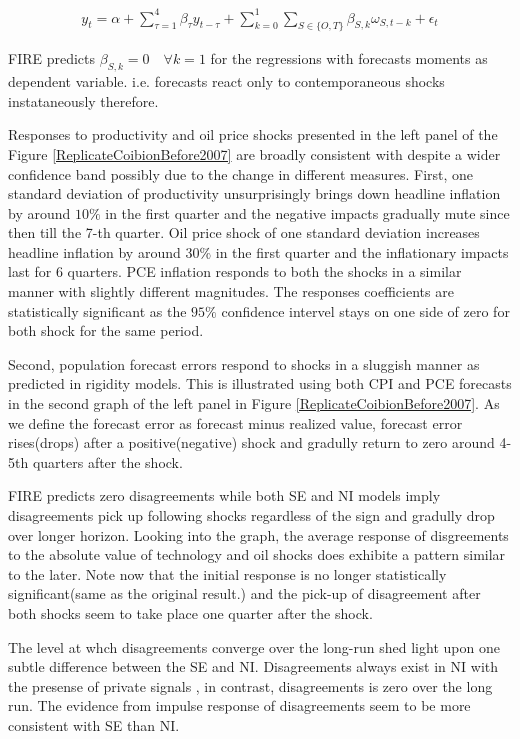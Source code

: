 \documentclass[]{article}
\begin{document}
\begin{eqnarray}\label{IRRegression}
y_{t}  = \alpha + \sum^4_{\tau=1} \beta_{\tau} y_{t-\tau} +  \sum^1_{k=0} \sum_{S \in \{O,T\}}\beta_{S,k}\omega_{S,t-k} + \epsilon_t 
\end{eqnarray}

FIRE predicts $\beta_{S,k}=0\quad \forall k=1$ for the regressions with forecasts moments as dependent variable. i.e. forecasts react only to contemporaneous shocks instataneously therefore. 


Responses to productivity and oil price shocks presented in the left panel of the Figure \ref{ReplicateCoibionBefore2007} are broadly consistent with \citet{coibion2012can} despite a wider confidence band possibly due to the change in different measures. First, one standard deviation of productivity unsurprisingly brings down headline inflation by around $10 \%$  in the first quarter and the negative impacts gradually mute since then till the 7-th quarter. Oil price shock of one standard deviation increases headline inflation by around $30\%$ in the first quarter and the inflationary impacts last for 6 quarters. PCE inflation responds to both the shocks in a similar manner with slightly different magnitudes. The responses coefficients are statistically significant as the $95\%$ confidence intervel stays on one side of zero for both shock for the same period. 

Second, population forecast errors respond to shocks in a sluggish manner as predicted in rigidity models. This is illustrated using both CPI and PCE forecasts in the second graph of the left panel in Figure \ref{ReplicateCoibionBefore2007}. As we define the forecast error as forecast minus realized value, forecast error rises(drops) after a positive(negative) shock and gradully return to zero around 4-5th quarters after the shock. 

FIRE predicts zero disagreements while both SE and NI models imply disagreements pick up following shocks regardless of the sign and gradully drop over longer horizon.  Looking into the graph, the average response of disgreements to the absolute value of technology and oil shocks does exhibite a pattern similar to the later.  Note now that the initial response is no longer statistically significant(same as the original result.) and the pick-up of disagreement after both shocks seem to take place one quarter after the shock. 

The level at whch disagreements converge over the long-run shed light upon one subtle difference between the SE and NI. Disagreements always exist in NI with the presense of private signals , in contrast, disagreements is zero over the long run. The evidence from impulse response of disagreements seem to be more consistent with SE than NI.
\end{document}
